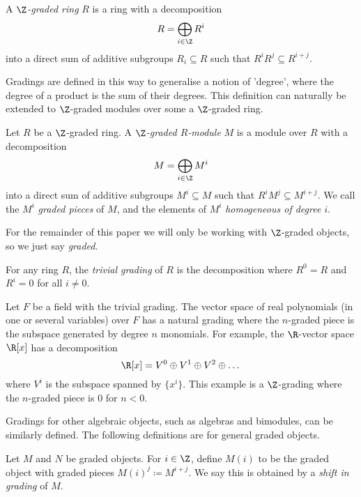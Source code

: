 \begin{definition}
    A \textit{$\Z$-graded ring} $R$ is a ring with a decomposition
    \[
        R = \bigoplus_{i \in \Z} R^i
    \]
    into a direct sum of additive subgroups $R_i \subseteq R$ such that $R^i R^j \subseteq R^{i+j}$.
\end{definition}

Gradings are defined in this way to generalise a notion of 'degree', where the degree of a product is the sum of their degrees. %
This definition can naturally be extended to $\Z$-graded modules over some a $\Z$-graded ring.

\begin{definition}
    Let $R$ be a $\Z$-graded ring. A \textit{$\Z$-graded $R$-module} $M$ is a module over $R$ with a decomposition
    \[
        M = \bigoplus_{i \in \Z} M^i
    \]
    into a direct sum of additive subgroups $M^i \subseteq M$ such that $R^i M^j \subseteq M^{i+j}$. We call the $M^i$ \textit{graded pieces} of $M$, and the elements of $M^i$ \textit{homogeneous of degree $i$}.
\end{definition}

For the remainder of this paper we will only be working with $\Z$-graded objects, so we just say \textit{graded}.

\begin{example}
    For any ring $R$, the \textit{trivial grading} of $R$ is the decomposition where $R^0 = R$ and $R^i = 0$ for all $i \neq 0$.
\end{example}

\begin{example}
    Let $F$ be a field with the trivial grading. The vector space of real polynomials (in one or several variables) over $F$ has a natural grading where the $n$-graded piece is the subspace generated by degree $n$ monomials. For example, the $\R$-vector space $\R[x]$ has a decomposition
    \[
        \R[x] = V^0 \oplus V^1 \oplus V^2 \oplus \dots
    \]
    where $V^i$ is the subspace spanned by $\{x^i\}$. This example is a $\Z$-grading where the $n$-graded piece is $0$ for $n < 0$.
\end{example}

Gradings for other algebraic objects, such as algebras and bimodules, can be similarly defined. The following definitions are for general graded objects.

\begin{definition}
    Let $M$ and $N$ be graded objects. For $i \in \Z$, define $M(i)$ to be the graded object with graded pieces $M(i)^j \coloneqq M^{i+j}$. We say this is obtained by a \textit{shift in grading} of $M$.
\end{definition}

